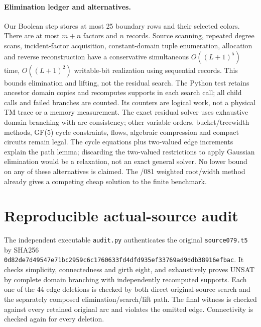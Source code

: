 \documentclass[11pt]{article}
\begin{document}
\paragraph{Elimination ledger and alternatives.}
Our Boolean step stores at most 25 boundary rows and their selected colors.
There are at most $m+n$ factors and $n$ records. Source scanning, repeated
degree scans, incident-factor acquisition, constant-domain tuple enumeration,
allocation and reverse reconstruction have a conservative simultaneous
$O((L+1)^5)$ time, $O((L+1)^2)$ writable-bit realization using sequential
records. This bounds elimination and lifting, not the residual search.
The Python test retains ancestor domain copies and recomputes supports in
each search call; all child calls and failed branches are counted. Its counters
are logical work, not a physical TM trace or a memory measurement.
The exact residual solver uses exhaustive domain branching with arc
consistency; other variable orders, bucket/treewidth methods, GF(5) cycle
constraints, flows, algebraic compression and compact circuits remain legal.
The cycle equations plus two-valued edge increments explain the path lemma;
discarding the two-valued restrictions to apply Gaussian elimination would
be a relaxation, not an exact general solver. No lower bound on any of these
alternatives is claimed. The /081 weighted root/width method already gives
a competing cheap solution to the finite benchmark.

\section*{Reproducible actual-source audit}
The independent executable \texttt{audit.py} authenticates the original
\texttt{source079.t5} by SHA256
\texttt{0d82de7d49547e71bc2959c6c1760633fd4dfd935ef33769ad9ddb38916efbac}.
It checks simplicity, connectedness and girth eight, and exhaustively proves
UNSAT by complete domain branching with independently recomputed supports.
Each one of the 44 edge deletions is checked by both direct original-source
search and the separately composed elimination/search/lift path. The final
witness is checked against every retained original arc and violates the
omitted edge. Connectivity is checked again for every deletion.
\end{document}
